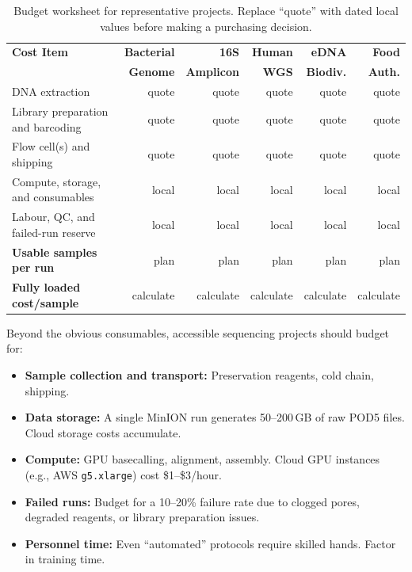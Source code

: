 \begin{table}[htbp]
\centering
\caption[Budget worksheet for accessible sequencing projects]{Budget worksheet for representative projects. Replace ``quote'' with dated local values before making a purchasing decision.}
\label{tab:accessible:costmodels}
\small
\renewcommand{\arraystretch}{1.25}
\begin{tabularx}{\textwidth}{@{}X r r r r r@{}}
\toprule
\textbf{Cost Item} & \textbf{Bacterial} & \textbf{16S} & \textbf{Human} & \textbf{eDNA} & \textbf{Food} \\
 & \textbf{Genome} & \textbf{Amplicon} & \textbf{WGS} & \textbf{Biodiv.} & \textbf{Auth.} \\
\midrule
DNA extraction & quote & quote & quote & quote & quote \\
Library preparation and barcoding & quote & quote & quote & quote & quote \\
Flow cell(s) and shipping & quote & quote & quote & quote & quote \\
Compute, storage, and consumables & local & local & local & local & local \\
Labour, QC, and failed-run reserve & local & local & local & local & local \\
\midrule
\textbf{Usable samples per run} & plan & plan & plan & plan & plan \\
\textbf{Fully loaded cost/sample} & calculate & calculate & calculate & calculate & calculate \\
\bottomrule
\end{tabularx}
\end{table}

\begin{keyconcept}[title={Hidden Costs to Budget For}]
Beyond the obvious consumables, accessible sequencing projects should budget for:
\begin{itemize}[nosep]
  \item \textbf{Sample collection and transport:} Preservation reagents, cold chain, shipping.
  \item \textbf{Data storage:} A single MinION run generates 50--200\,GB of raw POD5 files. Cloud storage costs accumulate.
  \item \textbf{Compute:} GPU basecalling, alignment, assembly. Cloud GPU instances (e.g., AWS \texttt{g5.xlarge}) cost \$1--\$3/hour.
  \item \textbf{Failed runs:} Budget for a 10--20\% failure rate due to clogged pores, degraded reagents, or library preparation issues.
  \item \textbf{Personnel time:} Even ``automated'' protocols require skilled hands. Factor in training time.
\end{itemize}
\end{keyconcept}

